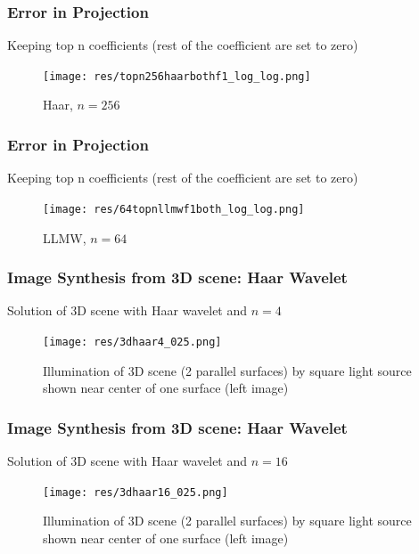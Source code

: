 \begin{frame}\frametitle{Error in Projection}
Keeping top n coefficients (rest of the coefficient are set to zero)
\vspace{-2 mm}
 \begin{figure}
              \centering
              \texttt{[image: res/topn256haarbothf1\_log\_log.png]}
              \vspace{-2 mm}
              \caption{Haar, $n = 256$}
              \label{fig_e_vs_n_f1}
              \end{figure}
\end{frame}

\begin{frame}\frametitle{Error in Projection}
Keeping top n coefficients (rest of the coefficient are set to zero)
\vspace{-2 mm}
 \begin{figure}
              \centering
              \texttt{[image: res/64topnllmwf1both\_log\_log.png]}
              \vspace{-2 mm}
              \caption{LLMW, $n = 64$}
              \label{fig_e_vs_n_f1}
              \end{figure}
\end{frame}



\begin{frame}\frametitle{Image Synthesis from 3D scene: Haar Wavelet}
Solution of 3D scene with Haar wavelet and $n=4$
\vspace{-2 mm}
 \begin{figure}
              \centering
              \texttt{[image: res/3dhaar4\_025.png]}
              \vspace{-2 mm}
              \caption{Illumination of 3D scene (2 parallel surfaces) by square light source shown near center of one surface (left image)}
              \label{fig_e_vs_n_f1}
              \end{figure}
\end{frame}

\begin{frame}\frametitle{Image Synthesis from 3D scene: Haar Wavelet}
Solution of 3D scene with Haar wavelet and $n=16$

\vspace{-2 mm}
 \begin{figure}
              \centering
              \texttt{[image: res/3dhaar16\_025.png]}
              \vspace{-2 mm}
              \caption{Illumination of 3D scene (2 parallel surfaces) by square light source shown near center of one surface (left image)}
              \label{fig_e_vs_n_f1}
              \end{figure}
\end{frame}

